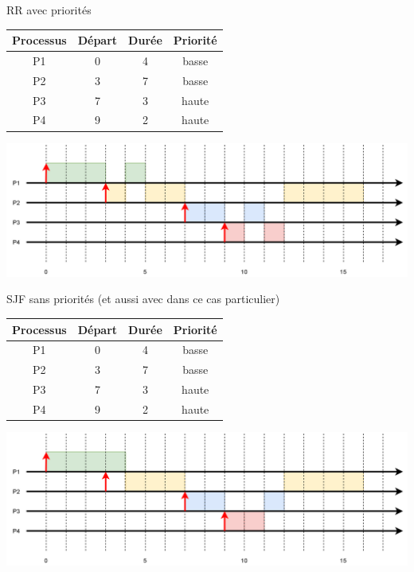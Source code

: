 \documentclass[10pt]{nsibeamer}
\begin{document}
\begin{frame}{RR avec priorités}
\scriptsize
\begin{center}
\begin{tabular}{|c|c|c|c|}
\hline\rowcolor{UGLiRed}
\textbf{\color{white} Processus} & \textbf{\color{white}Départ} & \textbf{\color{white}Durée} & \textbf{\color{white}Priorité} \\
\hline
P1 & 0 & 4 & basse \\
\hline
P2 & 3 & 7 & basse \\
\hline
P3 & 7 & 3 & haute \\
\hline
P4 & 9 & 2 & haute \\
\hline
\end{tabular}
\end{center}
\includegraphics[width=\linewidth]{img/RRP}
\end{frame}
\begin{frame}{SJF sans priorités (et aussi avec dans ce cas particulier)}
\scriptsize
\begin{center}
\begin{tabular}{|c|c|c|c|}
\hline\rowcolor{UGLiRed}
\textbf{\color{white} Processus} & \textbf{\color{white}Départ} & \textbf{\color{white}Durée} & \textbf{\color{white}Priorité} \\
\hline
P1 & 0 & 4 & basse \\
\hline
P2 & 3 & 7 & basse \\
\hline
P3 & 7 & 3 & haute \\
\hline
P4 & 9 & 2 & haute \\
\hline
\end{tabular}
\end{center}
\includegraphics[width=\linewidth]{img/SJF}
\end{frame}
\end{document}
